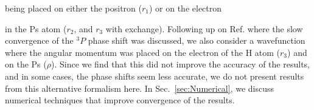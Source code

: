 \documentclass[preprint,showpacs,showkeys,preprintnumbers,amsmath,amssymb,longbibliography,pra,aps]{revtex4-1}
\begin{document}
being placed on either the positron ($r_1$) or on the electron {in the Ps
atom ($r_2$, and $r_3$
with exchange). Following up on Ref. \cite{VanReeth2004} where the slow 
convergence of the $^3P$ phase shift was discussed, we also consider a 
wavefunction where the angular momentum was placed on the electron of the H 
atom ($r_3$) and on the Ps ($\rho$). Since we find that this did not improve the
accuracy of the results, and in some cases, the phase shifts seem less
accurate, we do not present results from this alternative
formalism here.
In Sec.~\ref{sec:Numerical}, we discuss numerical techniques that improve
convergence of the results.


}
\end{document}
